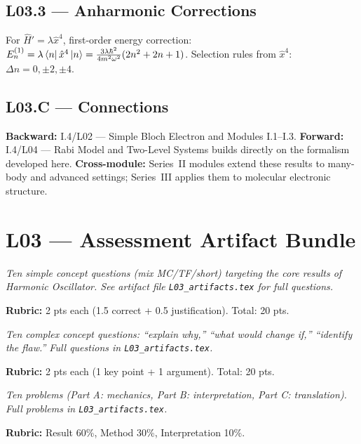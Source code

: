 \subsection*{L03.3 — Anharmonic Corrections}
For $\hat{H}' = \lambda\hat{x}^4$, first-order energy correction:
$E_n^{(1)} = \lambda\bra{n}\hat{x}^4\ket{n} = \frac{3\lambda\hbar^2}{4m^2\omega^2}(2n^2+2n+1)$.
Selection rules from $\hat{x}^4$: $\Delta n = 0,\pm2,\pm4$.


\subsection*{L03.C — Connections}
\label{sec:L03.C}
\textbf{Backward:} I.4/L02 — Simple Bloch Electron and Modules I.1–I.3.
\textbf{Forward:} I.4/L04 — Rabi Model and Two-Level Systems builds directly on the formalism developed here.
\textbf{Cross-module:} Series~II modules extend these results to many-body and
advanced settings; Series~III applies them to molecular electronic structure.

\newpage
\section*{L03 — Assessment Artifact Bundle}

\begin{tcolorbox}[ugconceptbox, title={SCQU · L03 · Tiers 1–3 · 15–20 min}]
\textit{Ten simple concept questions (mix MC/TF/short) targeting the core results
of Harmonic Oscillator. See artifact file \texttt{L03_artifacts.tex} for full questions.}

\textbf{Rubric:} 2 pts each (1.5 correct + 0.5 justification). Total: 20 pts.
\end{tcolorbox}

\begin{tcolorbox}[ugconceptbox, title={CCQU · L03 · Tiers 2–3 · 25–35 min}]
\textit{Ten complex concept questions: ``explain why,'' ``what would change if,''
``identify the flaw.'' Full questions in \texttt{L03_artifacts.tex}.}

\textbf{Rubric:} 2 pts each (1 key point + 1 argument). Total: 20 pts.
\end{tcolorbox}

\begin{tcolorbox}[ugprobbox, title={SPSU · L03 · Tiers 1–3 · 60–90 min}]
\textit{Ten problems (Part A: mechanics, Part B: interpretation, Part C: translation).
Full problems in \texttt{L03_artifacts.tex}.}

\textbf{Rubric:} Result 60\%, Method 30\%, Interpretation 10\%.
\end{tcolorbox}

